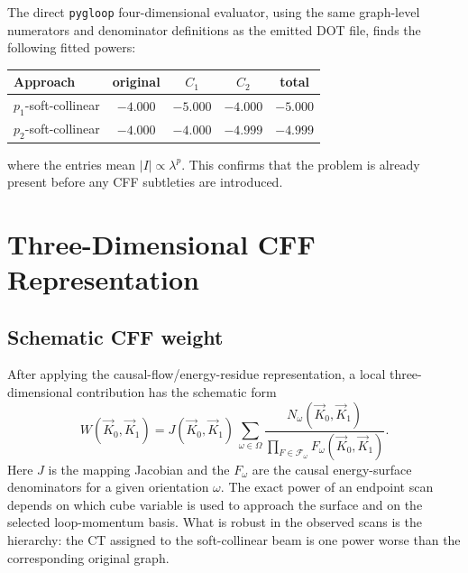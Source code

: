 \documentclass[11pt]{report}
\begin{document}
The direct \texttt{pygloop} four-dimensional evaluator, using the same
graph-level numerators and denominator definitions as the emitted DOT file,
finds the following fitted powers:
\begin{center}
\begin{tabular}{lcccc}
\toprule
Approach & original & \(C_1\) & \(C_2\) & total\\
\midrule
\(p_1\)-soft-collinear & \(-4.000\) & \(-5.000\) & \(-4.000\) & \(-5.000\)\\
\(p_2\)-soft-collinear & \(-4.000\) & \(-4.000\) & \(-4.999\) & \(-4.999\)\\
\bottomrule
\end{tabular}
\end{center}
where the entries mean \(|I|\propto \lambda^{p}\). This confirms that the
problem is already present before any CFF subtleties are introduced.

\chapter{Three-Dimensional CFF Representation}

\section{Schematic CFF weight}

After applying the causal-flow/energy-residue representation, a local
three-dimensional contribution has the schematic form
\[
  W(\vec K_0,\vec K_1)
  =
  J(\vec K_0,\vec K_1)\,
  \sum_{\omega\in\Omega}
  \frac{N_\omega(\vec K_0,\vec K_1)}
       {\prod_{F\in\mathcal F_\omega} F_\omega(\vec K_0,\vec K_1)} .
  \label{eq:cff-weight}
\]
Here \(J\) is the mapping Jacobian and the \(F_\omega\) are the causal
energy-surface denominators for a given orientation \(\omega\). The exact
power of an endpoint scan depends on which cube variable is used to approach
the surface and on the selected loop-momentum basis. What is robust in the
observed scans is the hierarchy: the CT assigned to the soft-collinear beam
is one power worse than the corresponding original graph.
\end{document}
